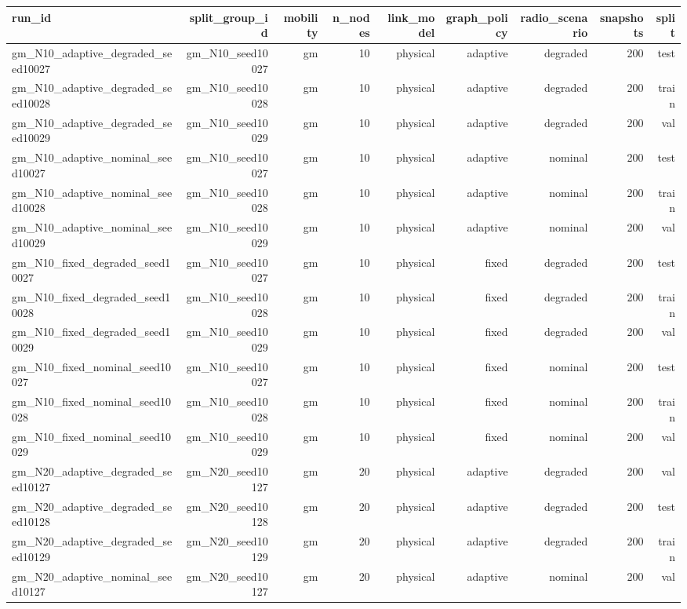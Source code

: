 \begin{tabular}{lrrrrrrrr}
\toprule
run\_id & split\_group\_id & mobility & n\_nodes & link\_model & graph\_policy & radio\_scenario & snapshots & split \\
\midrule
gm\_N10\_adaptive\_degraded\_seed10027 & gm\_N10\_seed10027 & gm & 10 & physical & adaptive & degraded & 200 & test \\
gm\_N10\_adaptive\_degraded\_seed10028 & gm\_N10\_seed10028 & gm & 10 & physical & adaptive & degraded & 200 & train \\
gm\_N10\_adaptive\_degraded\_seed10029 & gm\_N10\_seed10029 & gm & 10 & physical & adaptive & degraded & 200 & val \\
gm\_N10\_adaptive\_nominal\_seed10027 & gm\_N10\_seed10027 & gm & 10 & physical & adaptive & nominal & 200 & test \\
gm\_N10\_adaptive\_nominal\_seed10028 & gm\_N10\_seed10028 & gm & 10 & physical & adaptive & nominal & 200 & train \\
gm\_N10\_adaptive\_nominal\_seed10029 & gm\_N10\_seed10029 & gm & 10 & physical & adaptive & nominal & 200 & val \\
gm\_N10\_fixed\_degraded\_seed10027 & gm\_N10\_seed10027 & gm & 10 & physical & fixed & degraded & 200 & test \\
gm\_N10\_fixed\_degraded\_seed10028 & gm\_N10\_seed10028 & gm & 10 & physical & fixed & degraded & 200 & train \\
gm\_N10\_fixed\_degraded\_seed10029 & gm\_N10\_seed10029 & gm & 10 & physical & fixed & degraded & 200 & val \\
gm\_N10\_fixed\_nominal\_seed10027 & gm\_N10\_seed10027 & gm & 10 & physical & fixed & nominal & 200 & test \\
gm\_N10\_fixed\_nominal\_seed10028 & gm\_N10\_seed10028 & gm & 10 & physical & fixed & nominal & 200 & train \\
gm\_N10\_fixed\_nominal\_seed10029 & gm\_N10\_seed10029 & gm & 10 & physical & fixed & nominal & 200 & val \\
gm\_N20\_adaptive\_degraded\_seed10127 & gm\_N20\_seed10127 & gm & 20 & physical & adaptive & degraded & 200 & val \\
gm\_N20\_adaptive\_degraded\_seed10128 & gm\_N20\_seed10128 & gm & 20 & physical & adaptive & degraded & 200 & test \\
gm\_N20\_adaptive\_degraded\_seed10129 & gm\_N20\_seed10129 & gm & 20 & physical & adaptive & degraded & 200 & train \\
gm\_N20\_adaptive\_nominal\_seed10127 & gm\_N20\_seed10127 & gm & 20 & physical & adaptive & nominal & 200 & val \\

\end{tabular}
